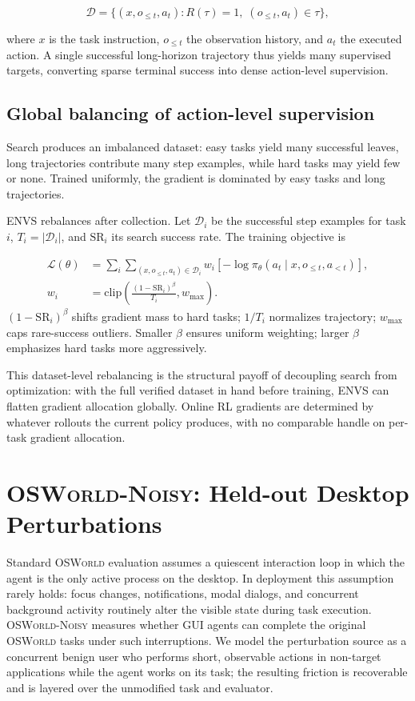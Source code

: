 \documentclass[11pt]{article}
\begin{document}
\[\mathcal{D} = \{(x, o_{\le t}, a_t) : R(\tau)=1,\; (o_{\le t}, a_t) \in \tau\},\]

where $x$ is the task instruction, $o_{\le t}$ the observation history, and $a_t$ the executed action. A single successful long-horizon trajectory thus yields many supervised targets, converting sparse terminal success into dense action-level supervision.

\subsection{Global balancing of action-level supervision}
Search produces an imbalanced dataset: easy tasks yield many successful leaves, long trajectories contribute many step examples, while hard tasks may yield few or none. Trained uniformly, the gradient is dominated by easy tasks and long trajectories.

ENVS rebalances after collection. Let $\mathcal{D}_i$ be the successful step examples for task $i$, $T_i = |\mathcal{D}_i|$, and $\mathrm{SR}_i$ its search success rate. The training objective is

\[
\begin{aligned}
\mathcal{L}(\theta)
&=
\sum_i
\sum_{(x,o_{\le t},a_t)\in \mathcal{D}_i}
w_i
\left[-\log \pi_\theta(a_t \mid x,o_{\le t},a_{<t})\right], \\
w_i
&=
\mathrm{clip}\!\left(
\frac{(1-\mathrm{SR}_i)^\beta}{T_i},
w_{\max}
\right).
\end{aligned}
\]
$(1-\mathrm{SR}_i)^\beta$ shifts gradient mass to hard tasks; $1/T_i$ normalizes trajectory; $w_{\max}$ caps rare-success outliers. Smaller $\beta$ ensures uniform weighting; larger $\beta$ emphasizes hard tasks more aggressively.

This dataset-level rebalancing is the structural payoff of decoupling search from optimization: with the full verified dataset in hand before training, ENVS can flatten gradient allocation globally. Online RL gradients are determined by whatever rollouts the current policy produces, with no comparable handle on per-task gradient allocation.

\section{\textsc{OSWorld-Noisy}: Held-out Desktop Perturbations}

Standard \textsc{OSWorld} evaluation assumes a quiescent interaction
loop in which the agent is the only active process on the desktop. In
deployment this assumption rarely holds: focus changes, notifications,
modal dialogs, and concurrent background activity routinely alter the
visible state during task execution. \textsc{OSWorld-Noisy} measures
whether GUI agents can complete the original \textsc{OSWorld} tasks
under such interruptions. We model the perturbation source as a
concurrent benign user who performs short, observable actions in
non-target applications while the agent works on its task; the
resulting friction is recoverable and is layered over the unmodified
task and evaluator.
\end{document}
